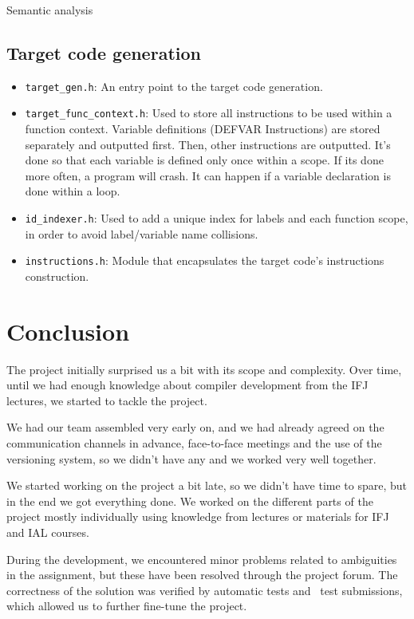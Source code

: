 \documentclass[a4paper, 11pt]{article}
\begin{document}
    	Semantic analysis
    

	\subsection{Target code generation}

	\begin{itemize}
    \item \texttt{target\_gen.h}: An entry point to the target code generation.
    \item \texttt{target\_func\_context.h}: Used to store all instructions to be used within a function context. Variable definitions (DEFVAR Instructions) are stored separately and outputted first. Then, other instructions are outputted. It's done so that each variable is defined only once within a scope. If its done more often, a program will crash. It can happen if a variable declaration is done within a loop.
    \item \texttt{id\_indexer.h}: Used to add a unique index for labels and each function scope, in order to avoid label/variable name collisions.
    \item \texttt{instructions.h}: Module that encapsulates the target code's instructions construction.
    
    \end{itemize}

	\section{Conclusion}

	The project initially surprised us a bit with its scope and complexity. Over time, until we had enough
	knowledge about compiler development from the IFJ lectures, we started to tackle the project.

	We had our team assembled very early on, and we had already agreed on the communication channels in advance,
	face-to-face meetings and the use of the versioning system, so we didn't have any
	and we worked very well together.

	We started working on the project a bit late, so we didn't have time to spare, but in the end
	we got everything done. We worked on the different parts of the project mostly individually using
	knowledge from lectures or materials for IFJ and IAL courses.

	During the development, we encountered minor problems related to ambiguities in the assignment, but
	these have been resolved through the project forum. The correctness of the solution was verified by automatic
	tests and ~test submissions, which allowed us to further fine-tune the project.
\end{document}
